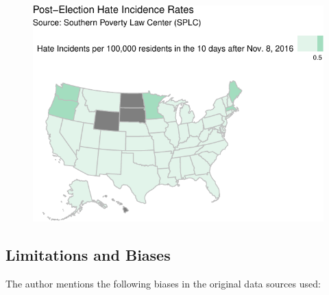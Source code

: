 \documentclass[
  letterpaper,
  DIV=11,
  numbers=noendperiod]{scrartcl}
\begin{document}
\begin{figure}[H]

{\centering \includegraphics{hate_crimes_reproduction_files/figure-pdf/post-election-hate-incidences-1.pdf}

}

\end{figure}

\hypertarget{limitations-and-biases}{%
\subsection{Limitations and Biases}\label{limitations-and-biases}}

The author mentions the following biases in the original data sources
used:
\end{document}
